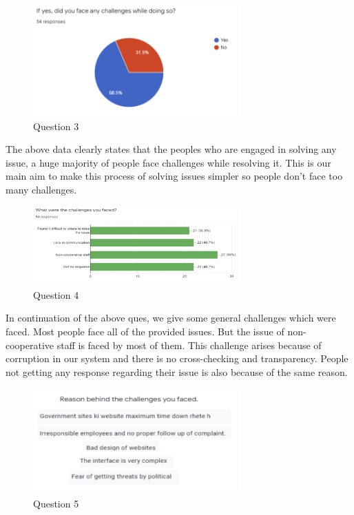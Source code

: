 \documentclass[acmtog]{acmart}
\begin{document}
\begin{description}
    \begin{figure}[H]
        \includegraphics[width=8cm]{Resources/q3}
        \caption{Question 3}
        \label{fig:q3}
    \end{figure}

    The above data clearly states that the peoples who are engaged in solving any issue, a huge majority of people face challenges while resolving it. This is our main aim to make this process of solving issues simpler so people don’t face too many challenges.


    \begin{figure}[H]
        \includegraphics[width=8cm]{Resources/q4}
        \caption{Question 4}
        \label{fig:q4}
    \end{figure}

    In continuation of the above ques, we give some general challenges which were faced. Most people face all of the provided issues. But the issue of non-cooperative staff is faced by most of them. This challenge arises because of corruption in our system and there is no cross-checking and transparency. People not getting any response regarding their issue is also because of the same reason.

    \begin{figure}[H]
        \includegraphics[width=8cm]{Resources/q5}
        \caption{Question 5}
        \label{fig:q5}
    \end{figure}


\end{description}
\end{document}
